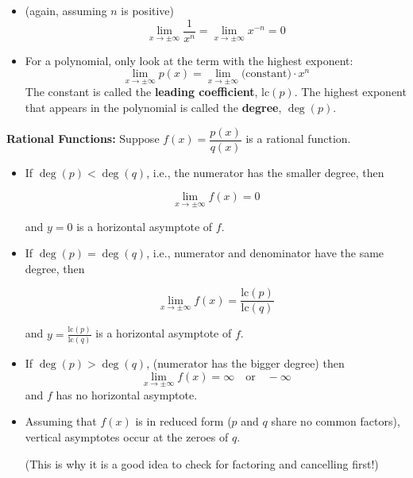 \documentclass[cal1spr16Lectures.tex]{subfiles}
\begin{document}
\begin{frame}\footnotesize
\begin{itemize}
\item (again, assuming $n$ is positive)
\[\lim_{x\to\pm\infty}\frac{1}{x^n}=\lim_{x\to\pm\infty}x^{-n}=0\]

\item For a polynomial, only look at the term with the highest exponent:
\[\lim_{x\to\pm\infty}p(x)=\lim_{x\to\pm\infty}\text{(constant)}\cdot x^n\] 
The constant is called the {\bf leading coefficient}, lc$(p)$.  The highest exponent that appears in the polynomial is called the {\bf degree}, $\deg(p)$.
\end{itemize}
\end{frame}

\begin{frame}\footnotesize
{\bf Rational Functions:}  Suppose $f(x)=\dfrac{p(x)}{q(x)}$ is a rational function.

\begin{itemize}
\item If $\deg(p)<\deg(q)$, i.e., \alert{the numerator has the smaller degree}, then 

\vspace{-1pc}
\[\lim_{x\to\pm\infty}f(x)=0\] 

\vspace{-0.5pc}
and $y=0$ is a horizontal asymptote of $f$.

\vspace{0.5pc}
\item If $\deg(p)=\deg(q)$, i.e., \alert{numerator and denominator have the same degree}, then 

\vspace{-1.5pc}
\[\lim_{x\to\pm\infty}f(x)=\dfrac{\text{lc}(p)}{\text{lc}(q)}\] 

\vspace{-0.5pc}
and $y=\textstyle\frac{\text{lc}(p)}{\text{lc}(q)}$ is a horizontal asymptote of $f$.
\end{itemize}
\end{frame}

\begin{frame}\footnotesize
\begin{itemize}
\item If $\deg(p)>\deg(q)$, \alert{(numerator has the bigger degree)} then 
\[\lim_{x\to\pm\infty}f(x)=\infty\quad\text{or}\quad -\infty\] 
and $f$ has no horizontal asymptote.

\vspace{0.5pc}
\item Assuming that $f(x)$ is in \alert{reduced form} ($p$ and $q$ share no common factors), vertical asymptotes occur at the zeroes of $q$.  

\vspace{0.5pc}
(This is why it is a good idea to check for factoring and cancelling first!)
\end{itemize}
\end{frame}
\end{document}
